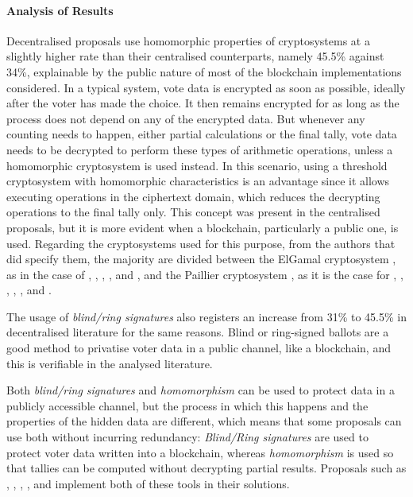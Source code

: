 \documentclass[../access.tex]{subfiles}
\begin{document}
\paragraph{Analysis of Results}
Decentralised proposals use homomorphic properties of cryptosystems at a slightly higher rate than their centralised counterparts, namely 45.5\% against 34\%, explainable by the public nature of most of the blockchain implementations considered. In a typical system, vote data is encrypted as soon as possible, ideally after the voter has made the choice. It then remains encrypted for as long as the process does not depend on any of the encrypted data. But whenever any counting needs to happen, either partial calculations or the final tally, vote data needs to be decrypted to perform these types of arithmetic operations, unless a homomorphic cryptosystem is used instead. In this scenario, using a threshold cryptosystem with homomorphic characteristics is an advantage since it allows executing operations in the ciphertext domain, which reduces the decrypting operations to the final tally only. This concept was present in the centralised proposals, but it is more evident when a blockchain, particularly a public one, is used. Regarding the cryptosystems used for this purpose, from the authors that did specify them, the majority are divided between the ElGamal cryptosystem \cite{ElGamal1984}, as in the case of \cite{Matile2019}, \cite{Wang2018}, \cite{Chaieb2018}, \cite{Yang2020}, \cite{Killer2020} and \cite{Li2021}, and the Paillier cryptosystem \cite{OKeeffe2008}, as it is the case for \cite{Hsiao2018}, \cite{Zhang2018}, \cite{Dagher2018}, \cite{Chaieb2019}, \cite{Lopes2019}, \cite{Zhang2019a} and \cite{Zhang2020}.
\par
The usage of \textit{blind/ring signatures} also registers an increase from 31\% to 45.5\% in decentralised literature for the same reasons. Blind or ring-signed ballots are a good method to privatise voter data in a public channel, like a blockchain, and this is verifiable in the analysed literature.
\par
Both \textit{blind/ring signatures} and \textit{homomorphism} can be used to protect data in a publicly accessible channel, but the process in which this happens and the properties of the hidden data are different, which means that some proposals can use both without incurring redundancy: \textit{Blind/Ring signatures} are used to protect voter data written into a blockchain, whereas \textit{homomorphism} is used so that tallies can be computed without decrypting partial results. Proposals such as \cite{Shaheen2017}, \cite{Wang2018}, \cite{Chaieb2019}, \cite{Zhang2019a}, \cite{Yang2020} and \cite{Zhang2020} implement both of these tools in their solutions.
\end{document}
